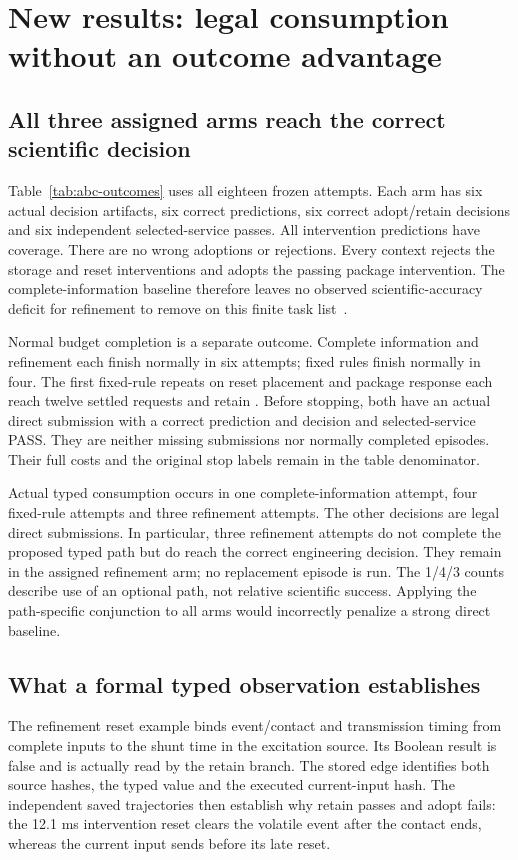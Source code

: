 \section{New results: legal consumption without an outcome advantage}
\label{sec:abc-results}
\subsection{All three assigned arms reach the correct scientific decision}
Table~\ref{tab:abc-outcomes} uses all eighteen frozen attempts. Each arm
has six actual decision artifacts, six correct predictions, six correct
adopt/retain decisions and six independent selected-service passes. All
intervention predictions have coverage. There are no wrong adoptions or
rejections. Every context rejects the storage and reset interventions and
adopts the passing package intervention. The complete-information baseline
therefore leaves no observed scientific-accuracy deficit for refinement to
remove on this finite task list~\cite{abcb,abcreview}.



Normal budget completion is a separate outcome. Complete information and
refinement each finish normally in six attempts; fixed rules finish normally
in four. The first fixed-rule repeats on reset placement and package response
each reach twelve settled requests and retain
. Before stopping, both have an actual direct
submission with a correct prediction and decision and selected-service PASS.
They are neither missing submissions nor normally completed episodes. Their
full costs and the original stop labels remain in the table denominator.

Actual typed consumption occurs in one complete-information attempt, four
fixed-rule attempts and three refinement attempts. The other decisions are
legal direct submissions. In particular, three refinement attempts do not
complete the proposed typed path but do reach the correct engineering
decision. They remain in the assigned refinement arm; no replacement episode
is run. The 1/4/3 counts describe use of an optional path, not relative
scientific success. Applying the path-specific conjunction to all arms would
incorrectly penalize a strong direct baseline.

\subsection{What a formal typed observation establishes}
The refinement reset example binds event/contact and transmission timing from
complete inputs to the shunt time in the excitation source. Its Boolean result
is false and is actually read by the retain branch. The stored edge identifies
both source hashes, the typed value and the executed current-input hash.
The independent saved trajectories then establish why retain passes and adopt
fails: the 12.1 ms intervention reset clears the volatile event after the
contact ends, whereas the current input sends before its late reset.

